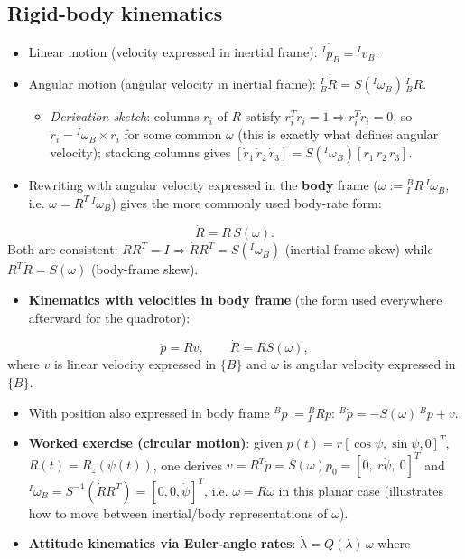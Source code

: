 \documentclass[11pt]{article}
\begin{document}
\subsection{Rigid-body kinematics}
\begin{itemize}
\item Linear motion (velocity expressed in inertial frame): $\dot{{}^Ip_B}={}^Iv_B$.
\item Angular motion (angular velocity in inertial frame): ${}^I_B\dot R = S({}^I\omega_B)\,{}^I_BR$.
\begin{itemize}
\item \textit{Derivation sketch}: columns $r_i$ of $R$ satisfy $r_i^Tr_i=1\Rightarrow r_i^T\dot r_i=0$, so $\dot r_i = {}^I\omega_B\times r_i$ for some common $\omega$ (this is exactly what defines angular velocity); stacking columns gives $[\dot r_1\,\dot r_2\,\dot r_3]=S({}^I\omega_B)[r_1\,r_2\,r_3]$.
\end{itemize}
\item Rewriting with angular velocity expressed in the \textbf{body} frame ($\omega:={}^B_IR\,{}^I\omega_B$, i.e. $\omega = R^T\,{}^I\omega_B$) gives the more commonly used body-rate form:
\end{itemize}
\[\dot R = R\,S(\omega).\]
Both are consistent: $RR^T=I \Rightarrow \dot R R^T = S({}^I\omega_B)$ (inertial-frame skew) while $R^T\dot R = S(\omega)$ (body-frame skew).
\begin{itemize}
\item \textbf{Kinematics with velocities in body frame} (the form used everywhere afterward for the quadrotor):
\end{itemize}
\[\dot p = Rv,\qquad \dot R = RS(\omega),\]
where $v$ is linear velocity expressed in $\{B\}$ and $\omega$ is angular velocity expressed in $\{B\}$.
\begin{itemize}
\item With position also expressed in body frame ${}^Bp:={}^B_IRp$: ${}^B\dot p = -S(\omega)\,{}^Bp+v$.
\item \textbf{Worked exercise (circular motion)}: given $p(t)=r[\cos\psi,\sin\psi,0]^T$, $R(t)=R_z(\psi(t))$, one derives $v=R^T\dot p = S(\omega)p_0 = [0,\ r\dot\psi,\ 0]^T$ and ${}^I\omega_B = S^{-1}(\dot R R^T) = [0,0,\dot\psi]^T$, i.e. $\omega=R\omega$ in this planar case (illustrates how to move between inertial/body representations of $\omega$).
\item \textbf{Attitude kinematics via Euler-angle rates}: $\dot\lambda = Q(\lambda)\,\omega$ where
\end{itemize}
\end{document}
